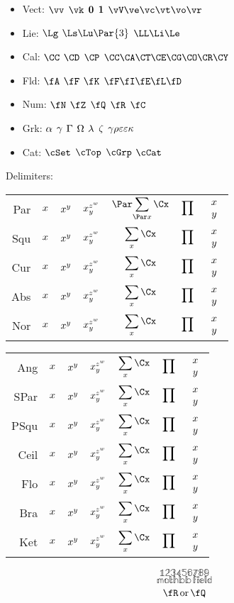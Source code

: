 \documentclass[11pt]{article}
\begin{document}
\psetSources{\TeXoR}
\mkPsetTitle{}

\newcommand{\alphabet}{Aa\,Bb\,Cc\,Dd\,Ee\,Ff\,Gg\,Hh\,Ii\,Jj\,Kk\,Ll\,Mm}
\newcommand{\alphabett}{Nn\,Oo\,Pp\,Qq\,Rr\,Ss\,Tt\,Uu\,Vv\,Ww\,Xx\,Yy\,Zz}
\newcommand{\numbers}{1\,2\,3\,4\,5\,6\,7\,8\,9\,0}
\newcommand{\greek}
    {A\al\,B\be\,\Ga\ga\,\De\de\,E\ep\,Z\ze\,H\eta\,\Te\te\,I\iota\,K\ka\,\lla\la\,M\mu}
\newcommand{\greekk}
    {N\nu\,\Xi\xi\,Oo\,\Pi\pi\,P\rho\,\Si\si\vsi\,T\tau\,Y\ups\,\Ph\phi\ph\,X\chi\,\Ps\ps\,\Om\om}

\begin{itemize}
    \item Vect: $\vv$ $\vk$ $\bm{\mathrm{0}}$ $\bm{\mathrm{1}}$ $\vV\ve\vc\vt\vo\vr$
    \item Lie: $\Lg$ $\Ls\Lu\Par{3}$ $\LL\Li\Le$
    \item Cal: $\CC$ $\CD$ $\CP$ $\CC\CA\CT\CE\CG\CO\CR\CY$
    \item Fld: $\fA$ $\fF$ $\fK$ $\fF\fI\fE\fL\fD$
    \item Num: $\N$ $\Z$ $\Q$ $\R$ $\C$
    \item Grk: $\alpha$ $\gamma$ $\Gamma$ $\Omega$ $\lambda$ $\zeta$ $\gamma\rho\varepsilon\varepsilon\kappa$
    \item Cat: $\cSet$ $\cTop$ $\cGrp$ $\cCat$
\end{itemize}

\newcommand{\deltest}[1]{%
#1 
& $\call{#1}{x}$ 
& $\call{#1}{x^y}$
& $x_{\call{#1}{y}}^{z^{\call{#1}{w}}}$
& $\displaystyle{\call{#1}{\sum_{\call{#1}{x}} \Cx}}$ 
& $\displaystyle{\call{#1}{\prod}}$
& $\call{#1}{\begin{array}{c}x\\y\end{array}}$ \\[6ex]
}

Delimiters:
\begin{center}
\begin{tabular}{r|cccccc}
    \deltest{Par} 
    \deltest{Squ}
    \deltest{Cur}
    \deltest{Abs}
    \deltest{Nor}
\end{tabular}
\begin{tabular}{r|cccccc}
    \deltest{Ang}
    \deltest{SPar}
    \deltest{PSqu}
    \deltest{Ceil}
    \deltest{Flo}
    \deltest{Bra}
    \deltest{Ket}
\end{tabular}
\end{center}

\[ \mathbb{123456789} \]
\[ \mathbb{mathbb\,field} \]
\[ \R \OR \Q \]
\end{document}
